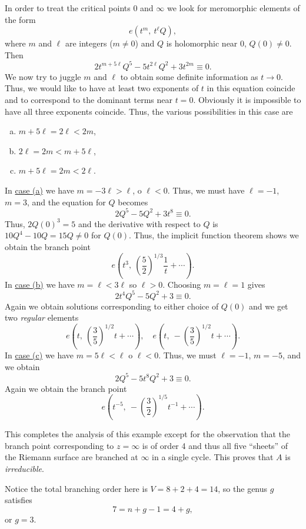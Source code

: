 \documentclass[a4paper,11pt]{article}
\begin{document}
\begin{exmp}
  In order to treat the critical points 0 and $\infty$ we look for
  meromorphic elements of the form
  $$
  e(t^m,\ t^\ell Q),
  $$
  where $m$ and $\ell$ are integers ($m\ne 0$) and $Q$ is holomorphic
  near 0, $Q(0) \ne 0$.  Then
  $$
  2t^{m+5\ell} Q^5 - 5t^{2\ell} Q^2 + 3t^{2m} \equiv 0.
  $$
  We now try to juggle $m$ and $\ell$ to obtain some definite
  information as $t \to 0$.  Thus, we would like to have at least two
  exponents of $t$ in this equation coincide and to correspond to the
  dominant terms near $t=0$.  Obviously it is impossible to have all
  three exponents coincide.  Thus, the various possibilities in this
  case are 
  \begin{enumerate}[(a)]
  \item $m + 5\ell = 2\ell < 2m$,
  \item $2\ell = 2m < m + 5\ell$,
  \item $m + 5\ell = 2m < 2\ell$.
  \end{enumerate}

  In \underline{case (a)} we have $m = -3\ell > \ell$, o $\ell < 0$.
  Thus, we must have $\ell = -1$, $m = 3$, and the equation for $Q$
  becomes
  $$
  2Q^5 - 5Q^2 + 3t^8 \equiv 0.
  $$
  Thus, $2Q(0)^3 = 5$ and the derivative with respect to $Q$ is $10Q^4
  - 10Q = 15Q \ne 0$ for $Q(0)$.  Thus, the implicit function theorem
  shows we obtain the branch point
  $$
  e(t^3,\ (\frac{5}{2})^{1/3} \frac{1}{t} + \cdots).
  $$
  In \underline{case (b)} we have $m = \ell < 3\ell$ so $\ell> 0$.
  Choosing $m = \ell = 1$ gives
  $$
  2t^4 Q^5 - 5Q^2 + 3 \equiv 0.
  $$
  Again we obtain solutions corresponding to either choice of $Q(0)$
  and we get two \emph{regular} elements
  $$
  e(t,\ (\frac{3}{5})^{1/2} t + \cdots),\quad
  e(t,\ -(\frac{3}{5})^{1/2} t + \cdots).
  $$
  In \underline{case (c)} we have $m = 5\ell < \ell$ o $\ell < 0$.
  Thus, we must $\ell = -1$, $m = -5$, and we obtain
  $$
  2Q^5 - 5t^8 Q^2 + 3 \equiv 0.
  $$
  Again we obtain the branch point
  $$
  e(t^{-5},\ -(\frac{3}{2})^{1/5} t^{-1} + \cdots).
  $$

  This completes the analysis of this example except for the
  observation that the branch point corresponding to $z = \infty$ is
  of order 4 and thus all five ``sheets'' of the Riemann surface are
  branched at $\infty$ in a single cycle.  This proves that $A$ is
  \emph{irreducible}.

  Notice the total branching order here is $V = 8 + 2 + 4 = 14$, so
  the genus $g$ satisfies
  $$
  7 = n + g - 1 = 4 + g,
  $$
  or $g = 3$.
\end{exmp}
\end{document}
